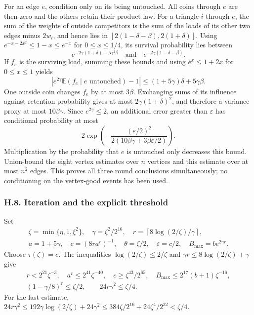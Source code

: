 \documentclass[english,11pt,a4paper]{article}
\begin{document}
For an edge \(e\), condition only on its being untouched. All coins through \(e\) are then zero and the others retain their product law. For a triangle \(i\) through \(e\), the sum of the weights of outside competitors is the sum of the loads of its other two edges minus \(2w_i\), and hence lies in \([2(1-\delta-\beta),2(1+\delta)]\). Using \(e^{-x-2x^2}\le1-x\le e^{-x}\) for \(0\le x\le1/4\), its survival probability lies between \[e^{-2\gamma(1+\delta)-5\gamma^2\beta}
\quad\text{and}\quad e^{-2\gamma(1-\delta-\beta)}.\] If \(f_e\) is the surviving load, summing these bounds and using \(e^x\le1+2x\) for \(0\le x\le1\) yields \[|e^{2\gamma}\mathbb E(f_e\mid e\text{ untouched})-1|
\le(1+5\gamma)\delta+5\gamma\beta.\] One outside coin changes \(f_e\) by at most \(3\beta\). Exchanging sums of its influence against retention probability gives at most \(2\gamma(1+\delta)^2\), and therefore a variance proxy at most \(10\beta\gamma\). Since \(e^{2\gamma}\le2\), an additional error greater than \(\varepsilon\) has conditional probability at most \[2\exp\left(-\frac{(\varepsilon/2)^2}
{2(10\beta\gamma+3\beta\varepsilon/2)}\right).\] Multiplication by the probability that \(e\) is untouched only decreases this bound. Union-bound the eight vertex estimates over \(n\) vertices and this estimate over at most \(n^2\) edges. This proves all three round conclusions simultaneously; no conditioning on the vertex-good events has been used.

\subsubsection{H.8. Iteration and the explicit threshold}\label{h.8.-iteration-and-the-explicit-threshold}

Set \[\begin{gathered}
\zeta=\min\{\eta,1,\xi^2\},\quad \gamma=\zeta^2/2^{16},\quad
r=\left\lceil8\log(2/\zeta)/\gamma\right\rceil,\\
a=1+5\gamma,\quad c=(8ra^r)^{-1},\quad
\theta=\zeta/2,\quad\varepsilon=c/2,\quad B_{\max}=be^{2\gamma r}.
\end{gathered}\] Choose \(\tau(\zeta)=c\). The inequalities \(\log(2/\zeta)\le2/\zeta\) and \(\gamma r\le8\log(2/\zeta)+\gamma\) give \[\begin{gathered}
r<2^{21}\zeta^{-3},\quad a^r\le2^{41}\zeta^{-40},\quad
c\ge\zeta^{43}/2^{65},\quad B_{\max}\le2^{17}(b+1)\zeta^{-16},\\
(1-\gamma/8)^r\le\zeta/2,\qquad24r\gamma^2\le\zeta/4.
\end{gathered}\] For the last estimate, \(24r\gamma^2\le192\gamma\log(2/\zeta)+24\gamma^2\le384\zeta/2^{16}+24\zeta^4/2^{32}<\zeta/4\).
\end{document}
